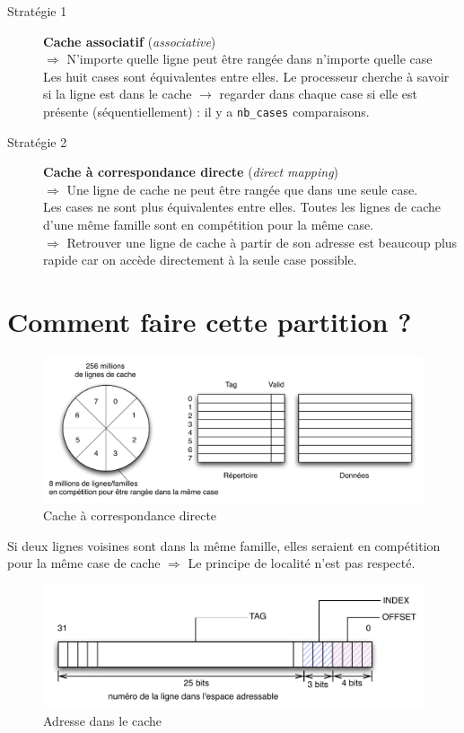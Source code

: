 \documentclass[11pt,english,french]{scrreprt}
\theoremstyle{remark}
\theoremstyle{definition}
\begin{document}
\begin{description}
	\item[Stratégie 1] \textbf{Cache associatif} (\emph{associative})\\
  	$\Rightarrow$ N'importe quelle ligne peut être rangée dans n'importe quelle case\\
	Les huit cases sont équivalentes entre elles. Le processeur cherche à savoir si la ligne est dans le cache $\rightarrow$ regarder dans chaque case si elle est présente (séquentiellement) : il y a \lstinline!nb_cases! comparaisons.
  
	\item[Stratégie 2] \textbf{Cache à correspondance directe} (\emph{direct mapping})\\
	$\Rightarrow$ Une ligne de cache ne peut être rangée que dans une seule case.\\
	Les cases ne sont plus équivalentes entre elles. Toutes les lignes de cache d'une même famille sont en compétition pour la même case.\\
	$\Rightarrow$ Retrouver une ligne de cache à partir de son adresse est beaucoup plus rapide car on accède directement à la seule case possible.
\end{description}
\clearpage
\section{Comment faire cette partition ?} %

\begin{figure}[!h]
	\center
	\includegraphics[scale=.65]{diagrammes/caches-familles}
	\caption{Cache à correspondance directe}
\end{figure}

Si deux lignes voisines sont dans la même famille, elles seraient en compétition pour la même case de cache $\Rightarrow$ Le principe de localité n'est pas respecté.

\begin{figure}[!h]
	\center
	\includegraphics[scale=.65]{diagrammes/adresse-cache}
	\caption{Adresse dans le cache}
\end{figure}
\end{document}
